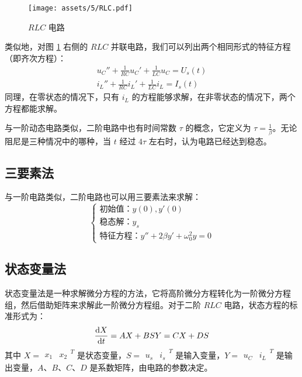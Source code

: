 \documentclass[UTF8]{report}
\theoremstyle{MyLineTheoremStyle} %
\theoremstyle{MyBlockTheoremStyle} %
\theoremstyle{MySubsubsectionStyle} %
\begin{document}
\begin{figure}[H]\centering
    \texttt{[image: assets/5/RLC.pdf]}
    \caption{$RLC$ 电路}\label{RLC}
\end{figure}

类似地，对图 \ref{RLC} 右侧的 $RLC$ 并联电路，我们可以列出两个相同形式的特征方程（即齐次方程）：
\begin{gather}
    u_C'' + \frac{1}{RC} u_C' + \frac{1}{LC} u_C = U_s(t) \\
    i_L'' + \frac{1}{RC} i_L' + \frac{1}{LC} i_L = I_s(t)
\end{gather}
同理，在零状态的情况下，只有 $i_L$ 的方程能够求解，在非零状态的情况下，两个方程都能求解。

与一阶动态电路类似，二阶电路中也有时间常数 $\tau$ 的概念，它定义为 $\tau = \frac{1}{\beta}$。无论阻尼是三种情况中的哪种，当 $t$ 经过 $4\tau$ 左右时，认为电路已经达到稳态。



\subsection{三要素法}
与一阶电路类似，二阶电路也可以用三要素法来求解：
\begin{equation}
\begin{cases}
    \text{初始值：} y(0), y'(0) \\
    \text{稳态解：} y_s \\
    \text{特征方程：} y'' + 2\beta y' + \omega_0^2 y = 0
\end{cases}
\end{equation}

\subsection{状态变量法}
状态变量法是一种求解微分方程的方法，它将高阶微分方程转化为一阶微分方程组，然后借助矩阵来求解此一阶微分方程组。对于二阶 $RLC$ 电路，状态方程的标准形式为：
\begin{equation}
\frac{\mathrm{d} X }{\mathrm{d} t } = A X + B S \\ 
Y = C X + D S
\end{equation}
其中 $X = \begin{matrix}x_1 & x_2\end{matrix}^T$ 是状态变量，$S = \begin{matrix}u_s & i_s\end{matrix}^T$ 是输入变量，$Y = \begin{matrix}u_C & i_L\end{matrix}^T$ 是输出变量，$A$、$B$、$C$、$D$ 是系数矩阵，由电路的参数决定。
\end{document}
